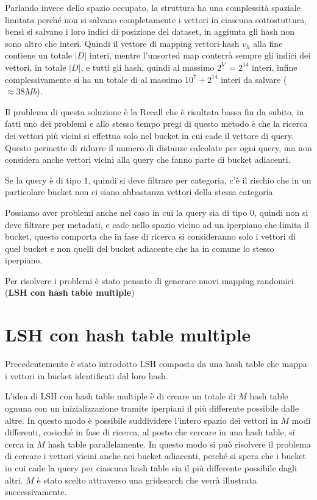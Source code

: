 Parlando invece dello spazio occupato, la struttura ha una complessità spaziale 
limitata perché non si salvano completamente i vettori in ciascuna sottostuttura,
bensì si salvano i loro indici di posizione del dataset, in aggiunta gli hash non 
sono altro che interi. Quindi il vettore di mapping vettori-hash $v_h$ alla fine 
contiene un totale $|D|$ interi, mentre l'unsorted map conterrà sempre gli indici 
dei vettori, in totale $|D|$, e tutti gli hash, quindi al massimo $2^{k'} = 2^ {14}$ 
interi, infine complessivamente si ha un totale di al massimo $10^7 + 2^{14}$ interi 
da salvare ($\approx 38 Mb$).

Il problema di questa soluzione è la Recall che è risultata bassa fin da subito, 
in fatti uno dei problemi e allo stesso tempo pregi di questo metodo è che la ricerca 
dei vettori più vicini si effettua solo nel bucket in cui cade il vettore di query.
Questo permette di ridurre il numero di distanze calcolate per ogni query, ma non 
considera anche vettori vicini alla query che fanno parte di bucket adiacenti.

\begin{esempio}
    Se la query è di tipo $1$, quindi si deve filtrare per categoria, c'è il rischio 
    che in un particolare bucket non ci siano abbastanza vettori della stessa categoria
\end{esempio}

\begin{esempio}
    Possiamo aver problemi anche nel caso in cui la query sia di tipo $0$, quindi non si 
    deve filtrare per metadati, e cade nello spazio vicino ad un iperpiano che limita il bucket, 
    questo comporta che in fase di ricerca si consideranno solo i vettori di quel 
    bucket e non quelli del bucket adiacente che ha in comune lo stesso iperpiano. 
\end{esempio}

Per risolvere i problemi è stato pensato di generare nuovi mapping randomici (\textbf{LSH con hash table multiple})

\section{LSH con hash table multiple}

Precedentemente è stato introdotto LSH composta da una hash table che mappa i vettori 
in bucket identificati dal loro hash.

L'idea di LSH con hash table multiple è di creare un totale di $M$ hash table ognuna con un
inizializzazione tramite iperpiani il più differente possibile dalle altre. In questo 
modo è possibile suddividere l'intero spazio dei vettori in $M$ modi differenti,
cosicché in fase di ricerca, al posto che cercare in una hash table, si cerca 
in $M$ hash table parallelamente. In questo modo si può risolvere il problema di 
cercare i vettori vicini anche nei bucket adiacenti, perché si spera che i bucket 
in cui cade la query per ciascuna hash table sia il più differente possibile dagli 
altri. $M$ è stato scelto attraverso una gridsearch che verrà illustrata successivamente.

